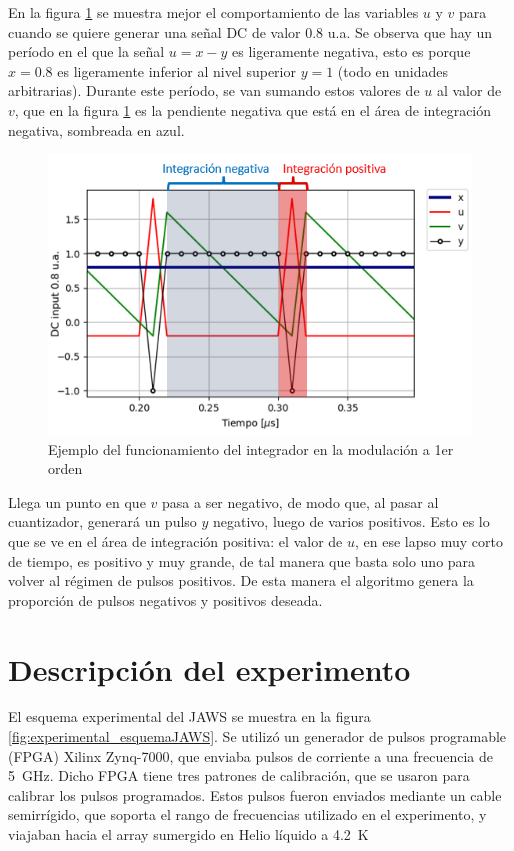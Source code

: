 \documentclass[twoside]{article}
\begin{document}
\begin{multicols}{2}
En la figura \ref{fig:integrador} se muestra mejor el comportamiento de las variables $u$ y $v$ para cuando se quiere generar una señal DC de valor 0.8 u.a. Se observa que hay un período en el que la señal $u=x-y$ es ligeramente negativa, esto es porque $x=0.8$ es ligeramente inferior al nivel superior $y=1$ (todo en unidades arbitrarias). Durante este período, se van sumando estos valores de $u$ al valor de $v$, que en la figura \ref{fig:integrador} es la pendiente negativa que está en el área de integración negativa, sombreada en azul.


\begin{figure}[H]
\centering
\includegraphics[width=\linewidth]{figuras/integracion.png}
\caption{Ejemplo del funcionamiento del integrador en la modulación a 1er orden}
\label{fig:integrador}
\end{figure}

Llega un punto en que $v$ pasa a ser negativo, de modo que, al pasar al cuantizador, generará un pulso $y$ negativo, luego de varios positivos. Esto es lo que se ve en el área de integración positiva: el valor de $u$, en ese lapso muy corto de tiempo, es positivo y muy grande, de tal manera que basta solo uno para volver al régimen de pulsos positivos. De esta manera el algoritmo genera la proporción de pulsos negativos y positivos deseada.

\section{Descripción del experimento}

El esquema experimental del JAWS se muestra en la figura \ref{fig:experimental_esquemaJAWS}. Se utilizó un generador de pulsos programable (FPGA) Xilinx Zynq-7000, que enviaba pulsos de corriente a una frecuencia de \SI{5}{\giga\hertz}. Dicho FPGA tiene tres patrones de calibración, que se usaron para calibrar los pulsos programados. Estos pulsos fueron enviados mediante un cable semirrígido, que soporta el rango de frecuencias utilizado en el experimento, y viajaban hacia el array sumergido en Helio líquido a \SI{4.2}{\kelvin}


\end{multicols}
\end{document}

